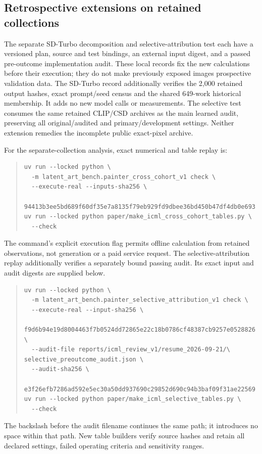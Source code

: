 \subsection{Retrospective extensions on retained collections}
The separate SD-Turbo decomposition and selective-attribution test each have a
versioned plan, source and test bindings, an external input digest, and a
passed pre-outcome implementation audit. These local records fix the new
calculations before their execution; they do not make previously exposed
images prospective validation data. The SD-Turbo record additionally verifies
the 2,000 retained output hashes, exact prompt/seed census and the shared
649-work historical membership. It adds no new model calls or measurements.
The selective test consumes the same retained CLIP/CSD archives as the main
learned audit, preserving all original/audited and primary/development settings.
Neither extension remedies the incomplete public exact-pixel archive.

For the separate-collection analysis, exact numerical and table replay is:
\begin{quote}\small
\begin{verbatim}
uv run --locked python \
  -m latent_art_bench.painter_cross_cohort_v1 check \
  --execute-real --inputs-sha256 \
  94413b3ee5bd689f60df35e7a8135f79eb929fd9dbee36bd450b47df4db0e693
uv run --locked python paper/make_icml_cross_cohort_tables.py \
  --check
\end{verbatim}
\end{quote}
The command's explicit execution flag permits offline calculation from retained
observations, not generation or a paid service request. The selective-attribution replay additionally verifies a separately bound
passing audit. Its exact input and audit digests are supplied below.
\begin{quote}\small
\begin{verbatim}
uv run --locked python \
  -m latent_art_bench.painter_selective_attribution_v1 check \
  --execute-real --input-sha256 \
  f9d6b94e19d8004463f7b0524dd72865e22c18b0786cf48387cb9257e0528826 \
  --audit-file reports/icml_review_v1/resume_2026-09-21/\
selective_preoutcome_audit.json \
  --audit-sha256 \
  e3f26efb7286ad592e5ec30a50dd937690c29852d690c94b3baf09f31ae22569
uv run --locked python paper/make_icml_selective_tables.py \
  --check
\end{verbatim}
\end{quote}
The backslash before the audit filename continues the same path; it introduces
no space within that path. New table builders verify source hashes and retain
all declared settings, failed operating criteria and sensitivity ranges.

